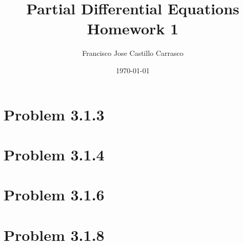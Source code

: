 




\title{Partial Differential Equations\\Homework 1}
\author{Francisco Jose Castillo Carrasco}
\date{\today}
\maketitle




\section*{Problem 3.1.3}


\section*{Problem 3.1.4}


\section*{Problem 3.1.6}


\section*{Problem 3.1.8}






